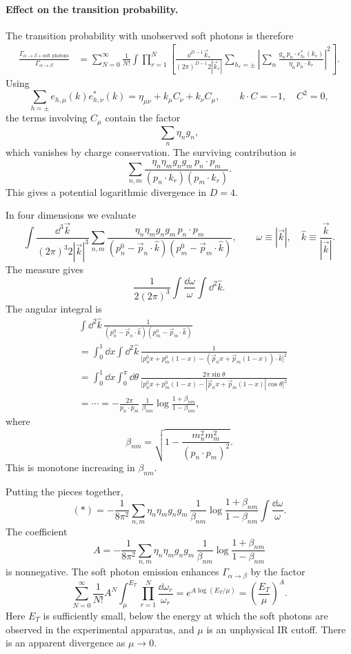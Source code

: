 \paragraph{Effect on the transition probability.}
The transition probability with unobserved soft photons is therefore
\[
\begin{aligned}
  \frac{\Gamma_{\alpha\to\beta+\text{soft photons}}}
       {\Gamma_{\alpha\to\beta}}
  &=
  \sum_{N=0}^{\infty}\frac{1}{N!}
  \int
  \prod_{r=1}^{N}
  \left[
    \frac{\dd^{D-1}\vec k_r}
    {(2\pi)^{D-1}2|\vec k_r|}
    \sum_{h_r=\pm}
    \left|
    \sum_n
    \frac{g_n\,p_n\cdot e_{h_r}^*(k_r)}
    {\eta_n\,p_n\cdot k_r}
    \right|^2
  \right].
\end{aligned}
\]
Using
\[
  \sum_{h=\pm}e_{h,\mu}(k)e^*_{h,\nu}(k)
  =
  \eta_{\mu\nu}+k_\mu C_\nu+k_\nu C_\mu,
  \qquad
  k\cdot C=-1,\quad C^2=0,
\]
the terms involving \(C_\mu\) contain the factor
\[
  \sum_n \eta_n g_n,
\]
which vanishes by charge conservation.  The surviving contribution is
\[
  \sum_{n,m}
  \frac{\eta_n\eta_m g_n g_m\,p_n\cdot p_m}
  {(p_n\cdot k_r)(p_m\cdot k_r)}.
\]
This gives a potential logarithmic divergence in \(D=4\).

In four dimensions we evaluate
\[
  \int
  \frac{\dd^3\vec k}{(2\pi)^3 2|\vec k|^3}
  \sum_{n,m}
  \frac{\eta_n\eta_m g_n g_m\,p_n\cdot p_m}
  {(p_n^0-\vec p_n\cdot\widehat k)
   (p_m^0-\vec p_m\cdot\widehat k)},
  \qquad
  \omega\equiv |\vec k|,\quad
  \widehat k\equiv\frac{\vec k}{|\vec k|}.
\]
The measure gives
\[
  \frac{1}{2(2\pi)^3}
  \int\frac{\dd\omega}{\omega}\int \dd^2\widehat k .
\]
The angular integral is
\[
\begin{aligned}
&\int \dd^2\widehat k\,
\frac{1}
{(p_n^0-\vec p_n\cdot\widehat k)
 (p_m^0-\vec p_m\cdot\widehat k)}
\\
&=
\int_0^1\dd x\int\dd^2\widehat k\,
\frac{1}
{\bigl[p_n^0x+p_m^0(1-x)
-(\vec p_nx+\vec p_m(1-x))\cdot\widehat k\bigr]^2}
\\
&=
\int_0^1\dd x\int_0^\pi\dd\theta\,
\frac{2\pi\sin\theta}
{\bigl[p_n^0x+p_m^0(1-x)
-|\vec p_nx+\vec p_m(1-x)|\cos\theta\bigr]^2}
\\
&=\cdots
=
-\frac{2\pi}{p_n\cdot p_m}\,
\frac{1}{\beta_{nm}}
\log\frac{1+\beta_{nm}}{1-\beta_{nm}},
\end{aligned}
\]
where
\[
  \beta_{nm}
  =
  \sqrt{
  1-\frac{m_n^2m_m^2}{(p_n\cdot p_m)^2}
  } .
\]
This is monotone increasing in \(\beta_{nm}\).

Putting the pieces together,
\[
  (*)=
  -\frac{1}{8\pi^2}
  \sum_{n,m}\eta_n\eta_m g_n g_m\,
  \frac{1}{\beta_{nm}}
  \log\frac{1+\beta_{nm}}{1-\beta_{nm}}
  \int\frac{\dd\omega}{\omega}.
\]
The coefficient
\[
  A=
  -\frac{1}{8\pi^2}
  \sum_{n,m}\eta_n\eta_m g_n g_m\,
  \frac{1}{\beta_{nm}}
  \log\frac{1+\beta_{nm}}{1-\beta_{nm}}
\]
is nonnegative.  The soft photon emission enhances
\(\Gamma_{\alpha\to\beta}\) by the factor
\[
  \sum_{N=0}^{\infty}\frac{1}{N!}
  A^N
  \int_\mu^{E_T}\prod_{r=1}^{N}
  \frac{\dd\omega_r}{\omega_r}
  =
  e^{A\log(E_T/\mu)}
  =
  \left(\frac{E_T}{\mu}\right)^A .
\]
Here \(E_T\) is sufficiently small, below the energy at which the soft
photons are observed in the experimental apparatus, and \(\mu\) is an
unphysical IR cutoff.  There is an apparent divergence as \(\mu\to0\).

